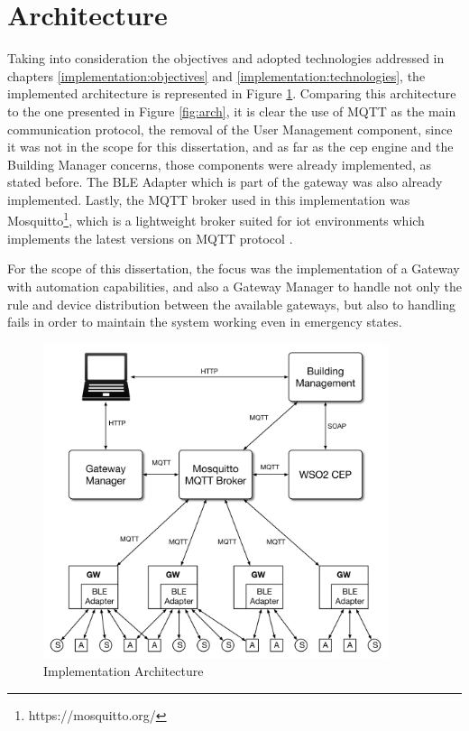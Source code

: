 	
\section{Architecture}
\label{implementation:architecture}
Taking into consideration the objectives and adopted technologies addressed in chapters \ref{implementation:objectives} and \ref{implementation:technologies}, the implemented architecture is represented in Figure \ref{fig:arch2}. Comparing this architecture to the one presented in Figure \ref{fig:arch}, it is clear the use of MQTT as the main communication protocol, the removal of the User Management component, since it was not in the scope for this dissertation, and as far as the \ac{cep} engine and the Building Manager concerns, those components were already implemented, as stated before. The BLE Adapter which is part of the gateway was also already implemented. Lastly, the MQTT broker used in this implementation was Mosquitto\footnote{https://mosquitto.org/}, which is a lightweight broker suited for \ac{iot} environments which implements the latest versions on MQTT protocol . 

For the scope of this dissertation, the focus was the implementation of a Gateway with automation capabilities, and also a Gateway Manager to handle not only the rule and device distribution between the available gateways, but also to handling fails in order to maintain the system working even in emergency states.


\begin{figure}[H]
	\centering
	\includegraphics[width=0.9\textwidth]{figures/architecture3.png}
	\caption{Implementation Architecture}
	\label{fig:arch2}
\end{figure}

